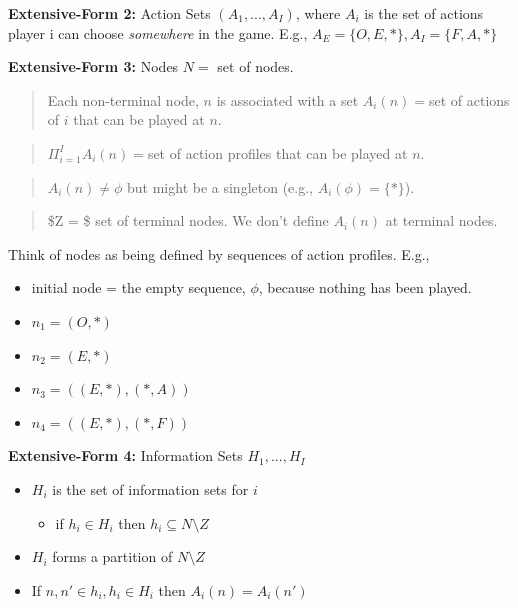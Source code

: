 \documentclass[
]{article}
\providecommand{\tightlist}{%
  \setlength{\itemsep}{0pt}\setlength{\parskip}{0pt}}
\begin{document}
\textbf{Extensive-Form 2:} Action Sets \((A_1, ..., A_I)\), where
\(A_i\) is the set of actions player i can choose \emph{somewhere} in
the game. E.g., \(A_E = \{O, E, *\}, A_I = \{F, A, *\}\)

\textbf{Extensive-Form 3:} Nodes \(N=\) set of nodes.

\begin{quote}
Each non-terminal node, \(n\) is associated with a set \(A_i(n)=\)set of
actions of \(i\) that can be played at \(n\).
\end{quote}

\begin{quote}
\(\Pi_{i=1}^I A_i(n)=\)set of action profiles that can be played at
\(n\).
\end{quote}

\begin{quote}
\(A_i(n) \neq \phi\) but might be a singleton (e.g.,
\(A_i(\phi) = \{*\}\)).
\end{quote}

\begin{quote}
\$Z = \$ set of terminal nodes. We don't define \(A_i(n)\) at terminal
nodes.
\end{quote}

Think of nodes as being defined by sequences of action profiles. E.g.,

\begin{itemize}
\tightlist
\item
  initial node = the empty sequence, \(\phi\), because nothing has been
  played.
\item
  \(n_1 = (O, *)\)
\item
  \(n_2 = (E, *)\)
\item
  \(n_3 = ((E, *), (*, A))\)
\item
  \(n_4 = ((E, *), (*, F))\)
\end{itemize}

\textbf{Extensive-Form 4:} Information Sets \(H_1, ..., H_I\)

\begin{itemize}
\tightlist
\item
  \(H_i\) is the set of information sets for \(i\)

  \begin{itemize}
  \tightlist
  \item
    if \(h_i \in H_i\) then \(h_i \subseteq N \setminus Z\)
  \end{itemize}
\item
  \(H_i\) forms a partition of \(N \setminus Z\)
\item
  If \(n, n' \in h_i, h_i \in H_i\) then \(A_i(n) = A_i(n')\)
\end{itemize}
\end{document}
